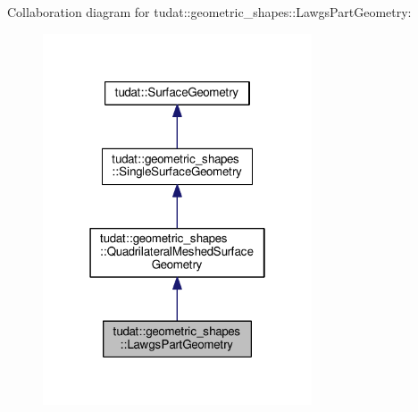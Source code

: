 Collaboration diagram for tudat\+:\+:geometric\+\_\+shapes\+:\+:Lawgs\+Part\+Geometry\+:
\nopagebreak
\begin{figure}[H]
\begin{center}
\leavevmode
\includegraphics[width=226pt]{classtudat_1_1geometric__shapes_1_1LawgsPartGeometry__coll__graph}
\end{center}
\end{figure}
